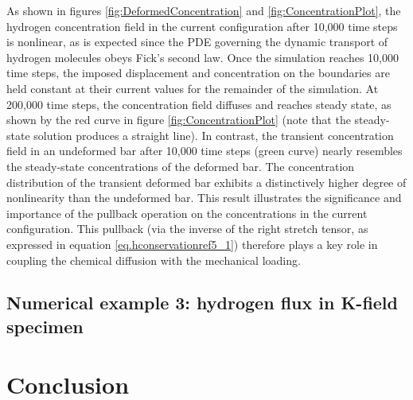\documentclass[10pt]{elsarticle}
\begin{document}
As shown in figures \ref{fig:DeformedConcentration} and \ref{fig:ConcentrationPlot}, the hydrogen concentration field in the current configuration after 10,000 time steps is nonlinear, as is expected since the PDE governing the dynamic transport of hydrogen molecules obeys Fick's second law.  Once the simulation reaches 10,000 time steps, the imposed displacement and concentration on the boundaries are held constant at their current values for the remainder of the simulation.  At 200,000 time steps, the concentration field diffuses and reaches steady state, as shown by the red curve in figure	 \ref{fig:ConcentrationPlot} (note that the steady-state solution produces a straight line).  In contrast, the transient concentration field in an undeformed bar after 10,000 time steps (green curve) nearly resembles the steady-state concentrations of the deformed bar.  The concentration distribution of the transient deformed bar exhibits a distinctively higher degree of nonlinearity than the undeformed bar.  This result illustrates the significance and importance of the pullback operation on the concentrations in the current configuration.  This pullback (via the inverse of the right stretch tensor, as expressed in equation \ref{eq.hconservationref5_1}) therefore plays a key role in coupling the chemical diffusion with the mechanical loading.
\subsection{Numerical example 3: hydrogen flux in K-field specimen}


\section{Conclusion}

%

\clearpage

%


%
\end{document}

